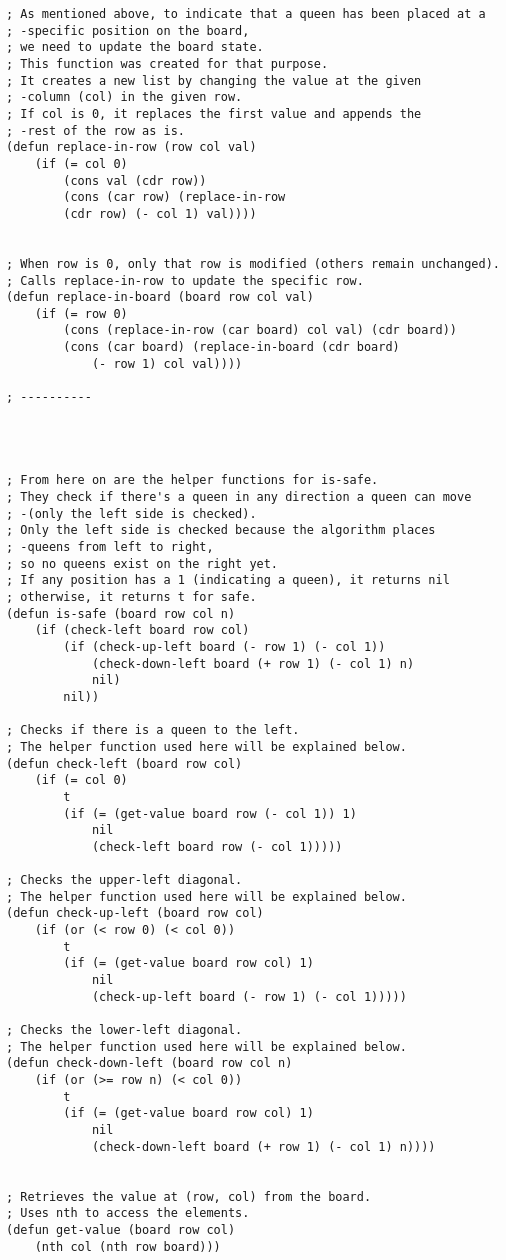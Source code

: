 \documentclass{article}
\begin{document}
\begin{lstlisting}
; As mentioned above, to indicate that a queen has been placed at a 
; -specific position on the board,
; we need to update the board state.
; This function was created for that purpose.
; It creates a new list by changing the value at the given 
; -column (col) in the given row.
; If col is 0, it replaces the first value and appends the 
; -rest of the row as is.
(defun replace-in-row (row col val)
	(if (= col 0)
		(cons val (cdr row))
		(cons (car row) (replace-in-row 
        (cdr row) (- col 1) val))))


; When row is 0, only that row is modified (others remain unchanged).
; Calls replace-in-row to update the specific row.
(defun replace-in-board (board row col val)
	(if (= row 0)
		(cons (replace-in-row (car board) col val) (cdr board))
		(cons (car board) (replace-in-board (cdr board) 
            (- row 1) col val))))

; ----------




; From here on are the helper functions for is-safe.
; They check if there's a queen in any direction a queen can move 
; -(only the left side is checked).
; Only the left side is checked because the algorithm places 
; -queens from left to right, 
; so no queens exist on the right yet.
; If any position has a 1 (indicating a queen), it returns nil
; otherwise, it returns t for safe.
(defun is-safe (board row col n)
	(if (check-left board row col)
		(if (check-up-left board (- row 1) (- col 1))
			(check-down-left board (+ row 1) (- col 1) n)
			nil)
		nil))

; Checks if there is a queen to the left.
; The helper function used here will be explained below.
(defun check-left (board row col)
	(if (= col 0)
		t
		(if (= (get-value board row (- col 1)) 1)
			nil
			(check-left board row (- col 1)))))

; Checks the upper-left diagonal.
; The helper function used here will be explained below.
(defun check-up-left (board row col)
	(if (or (< row 0) (< col 0))
		t
		(if (= (get-value board row col) 1)
			nil
			(check-up-left board (- row 1) (- col 1)))))

; Checks the lower-left diagonal.
; The helper function used here will be explained below.
(defun check-down-left (board row col n)
	(if (or (>= row n) (< col 0))
		t
		(if (= (get-value board row col) 1)
			nil
			(check-down-left board (+ row 1) (- col 1) n))))


; Retrieves the value at (row, col) from the board.
; Uses nth to access the elements.
(defun get-value (board row col)
	(nth col (nth row board)))


\end{lstlisting}
\end{document}
